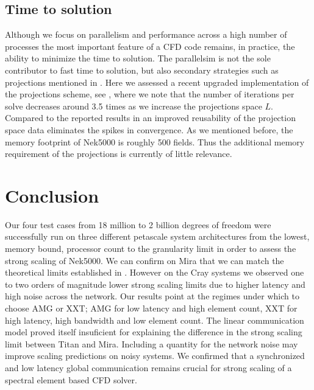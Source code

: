 \documentclass{sig-alternate}
\begin{document}
\subsection{Time to solution}
Although we focus on parallelism and performance across a high number of
processes the most important feature of a CFD code remains, in practice, the
ability to minimize the time to solution. The parallelsim is not the sole
contributor to fast time to solution, but also secondary strategies such as
projections mentioned in . Here we assessed a recent upgraded
implementation of the projections scheme, see , where we
note that the number of iterations per solve decreases around 3.5 times as we
increase the projections space $L$. Compared to the reported results in
\cite{Fischer1998} an improved reusability of the projection space data
eliminates the spikes in convergence. As we mentioned before, the memory
footprint of Nek5000 is roughly 500 fields. Thus the additional memory
requirement of the projections is currently of little relevance. 


\section{Conclusion}
Our four test cases from 18 million to 2 billion degrees of freedom were
successfully run on three different petascale system architectures from the
lowest, memory bound, processor count to the granularity limit in order to
assess the strong scaling of Nek5000. We can confirm on Mira that  we can match the theoretical limits established in \cite{fischer:scaling}. However on the Cray systems we observed one to two orders of magnitude
lower strong scaling limits due to higher
latency and high noise across the network. %
Our results point at the regimes under which to choose AMG or
XXT; AMG for low latency and high element count, XXT for high latency, high
bandwidth and low element count. The linear communication model proved itself insuficient for explaining the difference in
the strong scaling limit between Titan and Mira. Including a 
quantity for the network noise may improve scaling predictions on noisy systems.
We confirmed that a synchronized and low latency global communication remains crucial for strong scaling of a spectral element based CFD solver.
\end{document}
